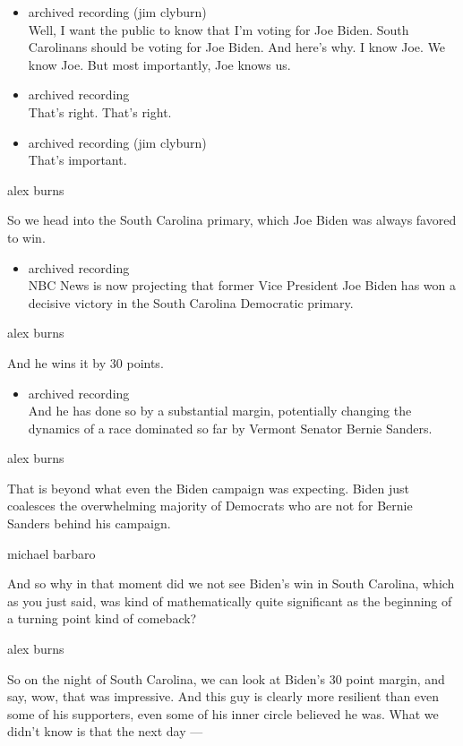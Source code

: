 \begin{itemize}
\item
  archived recording (jim clyburn)\\
  Well, I want the public to know that I'm voting for Joe Biden. South
  Carolinans should be voting for Joe Biden. And here's why. I know Joe.
  We know Joe. But most importantly, Joe knows us.
\item
  archived recording\\
  That's right. That's right.
\item
  archived recording (jim clyburn)\\
  That's important.
\end{itemize}

alex burns

So we head into the South Carolina primary, which Joe Biden was always
favored to win.

\begin{itemize}
\tightlist
\item
  archived recording\\
  NBC News is now projecting that former Vice President Joe Biden has
  won a decisive victory in the South Carolina Democratic primary.
\end{itemize}

alex burns

And he wins it by 30 points.

\begin{itemize}
\tightlist
\item
  archived recording\\
  And he has done so by a substantial margin, potentially changing the
  dynamics of a race dominated so far by Vermont Senator Bernie Sanders.
\end{itemize}

alex burns

That is beyond what even the Biden campaign was expecting. Biden just
coalesces the overwhelming majority of Democrats who are not for Bernie
Sanders behind his campaign.

michael barbaro

And so why in that moment did we not see Biden's win in South Carolina,
which as you just said, was kind of mathematically quite significant as
the beginning of a turning point kind of comeback?

alex burns

So on the night of South Carolina, we can look at Biden's 30 point
margin, and say, wow, that was impressive. And this guy is clearly more
resilient than even some of his supporters, even some of his inner
circle believed he was. What we didn't know is that the next day ---

